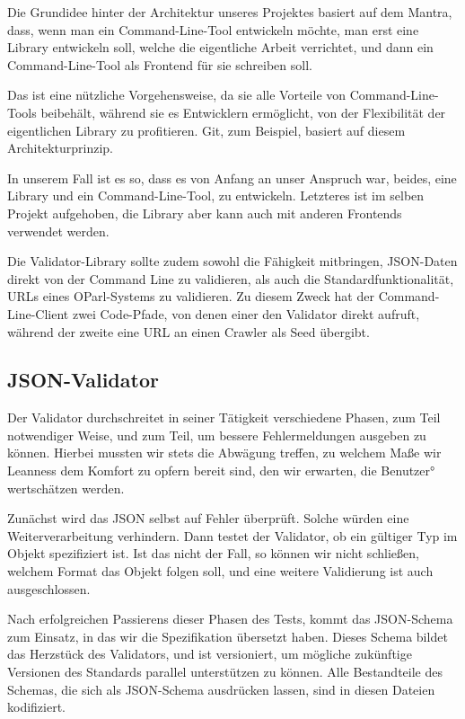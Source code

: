\documentclass[12pt, fleqn]{scrartcl}
\begin{document}
Die Grundidee hinter der Architektur unseres Projektes basiert auf dem Mantra, dass, wenn man ein Command-Line-Tool entwickeln möchte, man erst eine Library entwickeln soll, welche die eigentliche Arbeit verrichtet, und dann ein Command-Line-Tool als Frontend für sie schreiben soll.

Das ist eine nützliche Vorgehensweise, da sie alle Vorteile von Command-Line-Tools beibehält, während sie es Entwicklern ermöglicht, von der Flexibilität der eigentlichen Library zu profitieren. Git, zum Beispiel, basiert auf diesem Architekturprinzip.

In unserem Fall ist es so, dass es von Anfang an unser Anspruch war, beides, eine Library und ein Command-Line-Tool, zu entwickeln. Letzteres ist im selben Projekt aufgehoben, die Library aber kann auch mit anderen Frontends verwendet werden.

Die Validator-Library sollte zudem sowohl die Fähigkeit mitbringen, JSON-Daten direkt von der Command Line zu validieren, als auch die Standardfunktionalität, URLs eines OParl-Systems zu validieren. Zu diesem Zweck hat der Command-Line-Client zwei Code-Pfade, von denen einer den Validator direkt aufruft, während der zweite eine URL an einen Crawler als Seed übergibt.

\subsection{JSON-Validator}

Der Validator durchschreitet in seiner Tätigkeit verschiedene Phasen, zum Teil notwendiger Weise, und zum Teil, um bessere Fehlermeldungen ausgeben zu können. Hierbei mussten wir stets die Abwägung treffen, zu welchem Maße wir Leanness dem Komfort zu opfern bereit sind, den wir erwarten, die Benutzer° wertschätzen werden.

Zunächst wird das JSON selbst auf Fehler überprüft. Solche würden eine Weiterverarbeitung verhindern. Dann testet der Validator, ob ein gültiger Typ im Objekt spezifiziert ist. Ist das nicht der Fall, so können wir nicht schließen, welchem Format das Objekt folgen soll, und eine weitere Validierung ist auch ausgeschlossen.

Nach erfolgreichen Passierens dieser Phasen des Tests, kommt das JSON-Schema zum Einsatz, in das wir die Spezifikation übersetzt haben. Dieses Schema bildet das Herzstück des Validators, und ist versioniert, um mögliche zukünftige Versionen des Standards parallel unterstützen zu können. Alle Bestandteile des Schemas, die sich als JSON-Schema ausdrücken lassen, sind in diesen Dateien kodifiziert.
\end{document}
